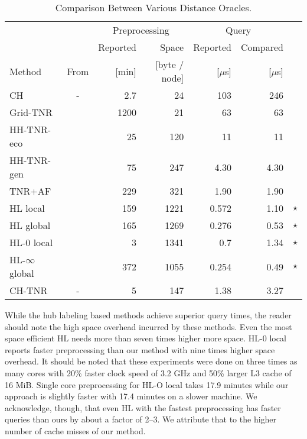 \documentclass{llncs}
\begin{document}
\begin{table}[hb]
\caption{Comparison Between Various Distance Oracles.}
\label{tab:tnr-compare-tnr-variant}
\centering
\begin{tabular}{lcrrrrr}
\toprule 
		& 		& \multicolumn{2}{c}{Preprocessing} 	& \multicolumn{2}{c}{Query} \\
\cmidrule(lr){3-4} \cmidrule(lr){5-6}
		& 		& Reported  		& Space		& {Reported} & {Compared} \\
Method 	& From	& [min] & [byte / node] 	& {[$\mu$s]} & {[$\mu$s]}\\ 
\midrule
CH 				   & - 						& 2.7 	& 24 & 103 & 246 \\[5pt]
Grid-TNR 		   & \cite{bfmss-itcsp-07} 	& 1200 	&   21	& 63	 & 63 \\
HH-TNR-eco 		   & \cite{s-rprn-08}		& 25  	&  120  & 11  	 & 11 \\
HH-TNR-gen 		   & \cite{s-rprn-08} 		& 75  	&  247  &  4.30	 & 4.30 \\
TNR+AF 			   & \cite{bdsssw-chgds-10}	& 229 	&  321  &  1.90	 & 1.90 \\
HL local		   & \cite{adgw-ahbla-11}   & 159 	& 1221  &  0.572 & 1.10 & $\star$\\
HL global		   & \cite{adgw-ahbla-11}   & 165 	& 1269  &  0.276 & 0.53 & $\star$\\
HL-0 local 		   & \cite{adgw-hhlsp-12} 	&   3 	& 1341  &  0.7   & 1.34 & $\star$\\
HL-$\infty$ global & \cite{adgw-hhlsp-12} 	& 372 	& 1055  &  0.254 & 0.49 & $\star$\\
\midrule
CH-TNR             &	 -					& 5   	& 147 	&  1.38  & 3.27 \\
\bottomrule 
\end{tabular}
\end{table}

While the hub labeling based methods achieve superior query times, the reader should note the high space overhead incurred by these methods.
Even the most space efficient HL needs more than seven times higher more space.
HL-0 local reports faster preprocessing than our method with nine times higher space overhead.
It should be noted that these experiments were done on three times as many cores with 20\% faster clock speed of 3.2 GHz and 50\% larger L3 cache of 16 MiB.
Single core preprocessing for HL-O local takes 17.9 minutes while our approach is slightly faster with 17.4 minutes on a slower machine.
We acknowledge, though, that even HL with the fastest preprocessing has faster queries than ours by about a factor of 2--3. 
We attribute that to the higher number of cache misses of our method.
\end{document}
